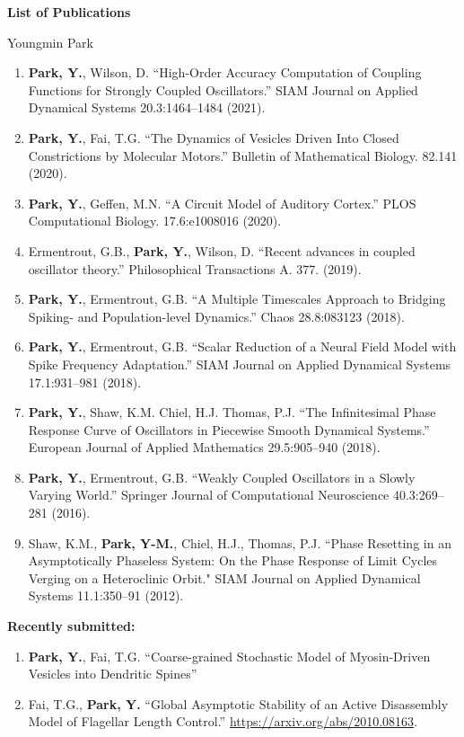 \documentclass[a4paper,11pt]{article}
\begin{document}
\begin{center}
\Large \textbf{List of Publications}

\Large Youngmin Park
\end{center}

\begin{enumerate}
\item \textbf{Park, Y.}, Wilson, D. ``High-Order Accuracy Computation of Coupling Functions for Strongly Coupled Oscillators.'' SIAM Journal on Applied Dynamical Systems 20.3:1464--1484 (2021).
 \item \textbf{Park, Y.}, Fai, T.G. ``The Dynamics of Vesicles Driven Into Closed Constrictions by Molecular Motors.'' Bulletin of Mathematical Biology. 82.141 (2020).
 \item \textbf{Park, Y.}, Geffen, M.N. ``A Circuit Model of Auditory Cortex.'' PLOS Computational Biology. 17.6:e1008016
 (2020).
 \item Ermentrout, G.B., \textbf{Park, Y.}, Wilson, D. ``Recent advances in coupled oscillator theory.'' Philosophical Transactions A. 377. (2019).
 \item \textbf{Park, Y.}, Ermentrout, G.B. ``A Multiple Timescales Approach to Bridging Spiking- and Population-level Dynamics.'' Chaos 28.8:083123 (2018).
 \item \textbf{Park, Y.}, Ermentrout, G.B. ``Scalar Reduction of a Neural Field Model with Spike Frequency Adaptation.'' SIAM Journal on Applied Dynamical Systems 17.1:931--981 (2018).
 \item \textbf{Park, Y.}, Shaw, K.M. Chiel, H.J. Thomas, P.J. ``The Infinitesimal Phase Response Curve of Oscillators in Piecewise Smooth Dynamical Systems.'' European Journal of Applied Mathematics 29.5:905--940 (2018).
 \item \textbf{Park, Y.}, Ermentrout, G.B. ``Weakly Coupled Oscillators in a Slowly Varying World.'' Springer Journal of Computational Neuroscience 40.3:269--281 (2016).
 \item Shaw, K.M., \textbf{Park, Y-M.}, Chiel, H.J., Thomas, P.J. ``Phase Resetting in an Asymptotically Phaseless System: On the Phase Response of Limit Cycles Verging on a Heteroclinic Orbit." SIAM Journal on Applied Dynamical Systems 11.1:350--91 (2012).
\end{enumerate}

\textbf{Recently submitted:}
\begin{enumerate}
	\item \textbf{Park, Y.}, Fai, T.G. ``Coarse-grained Stochastic Model of Myosin-Driven Vesicles into Dendritic Spines''
	\item Fai, T.G., \textbf{Park, Y.} ``Global Asymptotic Stability of an Active  Disassembly Model of Flagellar Length Control.''  \url{https://arxiv.org/abs/2010.08163}.
\end{enumerate}
\end{document}
